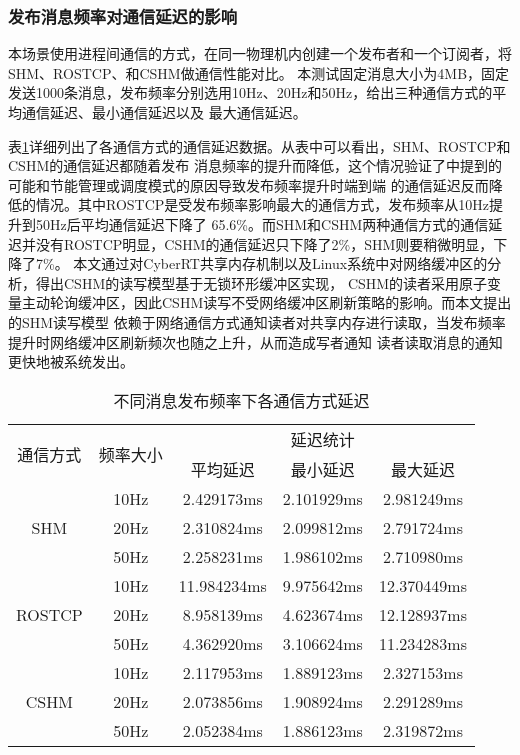 \subsubsection{发布消息频率对通信延迟的影响}
本场景使用进程间通信的方式，在同一物理机内创建一个发布者和一个订阅者，将SHM、ROSTCP、和CSHM做通信性能对比。
本测试固定消息大小为4MB，固定发送1000条消息，发布频率分别选用10Hz、20Hz和50Hz，给出三种通信方式的平均通信延迟、最小通信延迟以及
最大通信延迟。

表\ref{frequency_test}详细列出了各通信方式的通信延迟数据。从表中可以看出，SHM、ROSTCP和CSHM的通信延迟都随着发布
消息频率的提升而降低，这个情况验证了\cite{9591166}中提到的可能和节能管理或调度模式的原因导致发布频率提升时端到端
的通信延迟反而降低的情况。其中ROSTCP是受发布频率影响最大的通信方式，发布频率从10Hz提升到50Hz后平均通信延迟下降了
65.6\%。而SHM和CSHM两种通信方式的通信延迟并没有ROSTCP明显，CSHM的通信延迟只下降了2\%，SHM则要稍微明显，下降了7\%。
本文通过对CyberRT共享内存机制以及Linux系统中对网络缓冲区的分析，得出CSHM的读写模型基于无锁环形缓冲区实现，
CSHM的读者采用原子变量主动轮询缓冲区，因此CSHM读写不受网络缓冲区刷新策略的影响。而本文提出的SHM读写模型
依赖于网络通信方式通知读者对共享内存进行读取，当发布频率提升时网络缓冲区刷新频次也随之上升，从而造成写者通知
读者读取消息的通知更快地被系统发出。

\begin{table}[htb]
  \centering\small
  \caption{不同消息发布频率下各通信方式延迟}
  \renewcommand\arraystretch{1.2}
  \label{frequency_test}
  \begin{tabular}{ccccc}
    \toprule
    \multirow{2}{*}{通信方式} & \multirow{2}{*}{频率大小} & \multicolumn{3}{c}{延迟统计}\\
    \cline{3-5}
     & & 平均延迟 & 最小延迟 & 最大延迟\\
    \midrule
    \multirow{3}{*}{SHM} & 10Hz& 2.429173ms& 2.101929ms& 2.981249ms\\ & 20Hz & 2.310824ms & 2.099812ms & 2.791724ms \\ & 50Hz & 2.258231ms & 1.986102ms & 2.710980ms \\
    \hline
    \multirow{3}{*}{ROSTCP} & 10Hz& 11.984234ms& 9.975642ms& 12.370449ms\\ & 20Hz & 8.958139ms & 4.623674ms & 12.128937ms \\ & 50Hz & 4.362920ms & 3.106624ms & 11.234283ms \\
    \hline
    \multirow{3}{*}{CSHM} & 10Hz& 2.117953ms& 1.889123ms& 2.327153ms\\ & 20Hz & 2.073856ms & 1.908924ms & 2.291289ms \\ & 50Hz & 2.052384ms & 1.886123ms & 2.319872ms \\
    \bottomrule
  \end{tabular}
\end{table}

